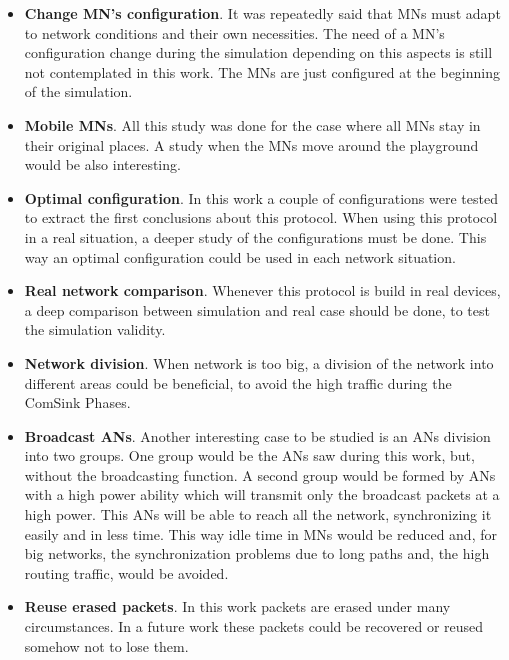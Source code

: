 \begin{itemize}
  \item \textbf{Change \ac{MN}'s configuration}. It was repeatedly said that \acp{MN} must adapt to network conditions and their own necessities. 
  The need of a \ac{MN}'s configuration change during the simulation depending on this aspects is still not contemplated in this work. The
  \acp{MN} are just configured at the beginning of the simulation.

  \item \textbf{Mobile \acp{MN}}. All this study was done for the case where all \acp{MN} stay in their original places. A study when the 
  \acp{MN} move around the playground would be also interesting.

  \item \textbf{Optimal configuration}. In this work a couple of configurations were tested to extract the first conclusions about
  this protocol. When using this protocol in a real situation, a deeper study of the configurations must be done. This way an optimal configuration
  could be used in each network situation.

  \item \textbf{Real network comparison}. Whenever this protocol is build in real devices, a deep comparison between simulation and real case should
  be done, to test the simulation validity.

  \item \textbf{Network division}. When network is too big, a division of the network into different areas could be beneficial, to avoid the high
  traffic during the ComSink Phases.

  \item \textbf{Broadcast \acp{AN}}. Another interesting case to be studied is an \acp{AN} division into two groups. One group would be the 
  \acp{AN} saw during this work, but, without the broadcasting function. A second group would be formed by \acp{AN} with a high power ability 
  which will transmit only the broadcast packets at a high power. This \acp{AN} will be able to reach all the network, synchronizing it 
  easily and in less time. This way idle time in \acp{MN} would be reduced and, for big networks, the synchronization problems due to long paths 
  and, the high routing traffic, would be avoided.

  \item \textbf{Reuse erased packets}. In this work packets are erased under many circumstances. In a future work these packets could be recovered
  or reused somehow not to lose them.


\end{itemize}
